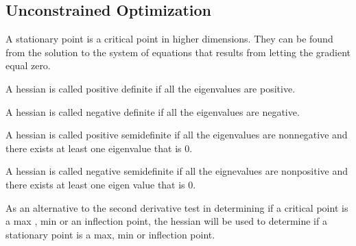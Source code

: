 \documentclass[12pt]{scrartcl}
\begin{document}
\subsection{Unconstrained Optimization}
\begin{definition}
    A \alert{stationary point} is a critical point in higher dimensions. They
    can be found from the solution to the system of equations that results
    from letting the gradient equal zero.
\end{definition}
\begin{definition}
    A hessian is called \alert{positive definite} if all the eigenvalues
    are positive.
\end{definition}
\begin{definition}
    A hessian is called \alert{negative definite} if all the eigenvalues
    are negative.
\end{definition}
\begin{definition}
    A hessian is called \alert{positive semidefinite} if all the eigenvalues
    are nonnegative and there exists at least one eigenvalue that is $0$.
\end{definition}
\begin{definition}
    A hessian is called \alert{negative semidefinite} if all the eignevalues
    are nonpositive and there exists at least one eigen value that is $0$.
\end{definition}
As an alternative to the second derivative test in determining if a critical
point is a max , min or an inflection point, the \alert{hessian} will be used 
to determine if a stationary point is a max, min or inflection point.
\end{document}

